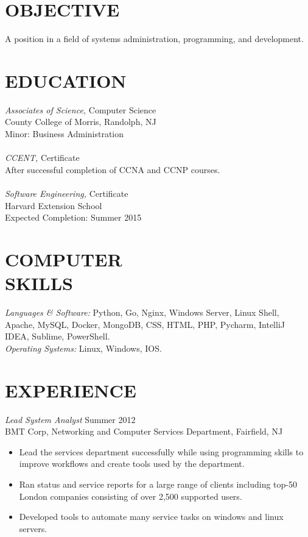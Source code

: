 \documentclass[line,margin]{res}
\begin{document}
\address{265  Main Road, Montville, NJ 07045 - 862-345-8316}
\address{github.com/odonnellryan - odonnellryanc@gmail.com}

\begin{resume}

\section{OBJECTIVE}	A position in a field of systems administration, programming, and development.

\section{EDUCATION} {\sl Associates of Science,} Computer Science \\
		County College of Morris, Randolph, NJ  \\
	 	Minor: Business Administration \\ \\
	{\sl CCENT,} Certificate \\
		After successful completion of CCNA and CCNP courses. \\ \\
	{\sl Software Engineering,} Certificate \\
		Harvard Extension School \\
		Expected Completion: Summer 2015

\section{COMPUTER \\ SKILLS} {\sl Languages \& Software:} Python, Go,
	Nginx, Windows Server, Linux Shell, Apache, MySQL, Docker, MongoDB, CSS, HTML, PHP,
	Pycharm, IntelliJ IDEA, Sublime, PowerShell. \\
	{\sl Operating Systems:} Linux, Windows, IOS.

\section{EXPERIENCE} {\sl Lead System Analyst} \hfill Summer 2012 \\
	BMT Corp, Networking and Computer Services Department, Fairfield, NJ
	\begin{itemize}  \itemsep -2pt
		\item Lead the services department successfully while using programming skills to improve
			workflows and create tools used by the department.
		\item Ran status and service reports for a large range of clients including top-50
			London companies consisting of over 2,500 supported users.
		\item   Developed tools to automate many service tasks on windows and linux servers.
	\end{itemize}


\end{resume}
\end{document}
